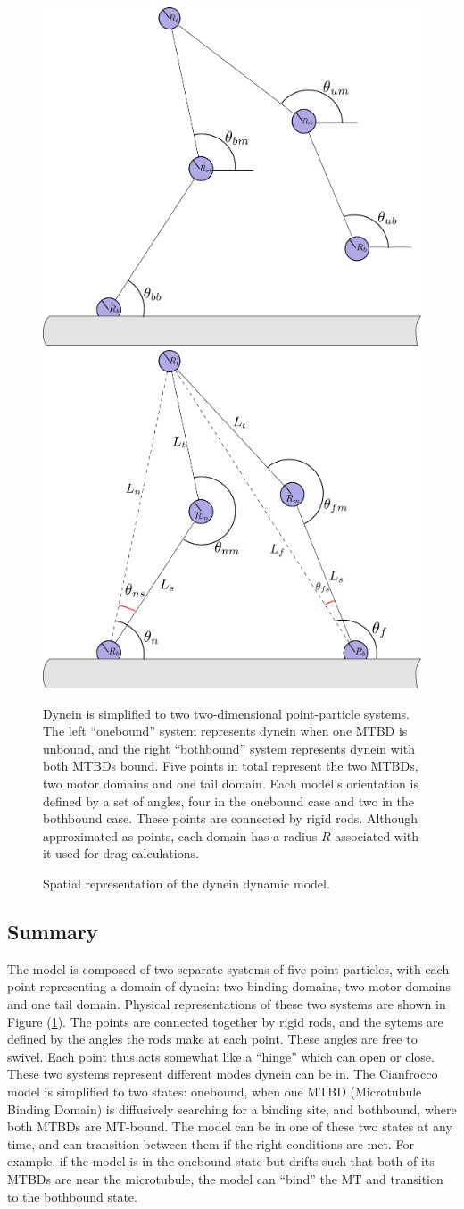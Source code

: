 \documentclass[
11pt, %
english, %
singlespacing, %
headsepline, %
chapterinoneline, %
]{MastersDoctoralThesis} %
\begin{document}
\begin{figure}[h]
  \centering
  \includegraphics[width=.45\textwidth]{../figures/theory-onebound}
  \includegraphics[width=.45\textwidth]{../figures/theory-bothbound}
  \caption{Spatial representation of the dynein dynamic model.}{Dynein is simplified to two two-dimensional point-particle systems. The left ``onebound'' system represents dynein when one MTBD is unbound, and the right ``bothbound'' system represents dynein with both MTBDs bound. Five points in total represent the two MTBDs, two motor domains and one tail domain. Each model's orientation is defined by a set of angles, four in the onebound case and two in the bothbound case. These points are connected by rigid rods. Although approximated as points, each domain has a radius $R$ associated with it used for drag calculations.}
  \label{fig:theory-intro}
\end{figure}

\subsection{Summary}
The model is composed of two separate systems of five point particles, with each point representing a domain of dynein: two binding domains, two motor domains and one tail domain. Physical representations of these two systems are shown in Figure (\ref{fig:theory-intro}). The points are connected together by rigid rods, and the sytems are defined by the angles the rods make at each point. These angles are free to swivel. Each point thus acts somewhat like a ``hinge'' which can open or close. These two systems represent different modes dynein can be in. The Cianfrocco model is simplified to two states: onebound, when one MTBD (Microtubule Binding Domain) is diffusively searching for a binding site, and bothbound, where both MTBDs are MT-bound. The model can be in one of these two states at any time, and can transition between them if the right conditions are met. For example, if the model is in the onebound state but drifts such that both of its MTBDs are near the microtubule, the model can ``bind'' the MT and transition to the bothbound state.\\
\end{document}
